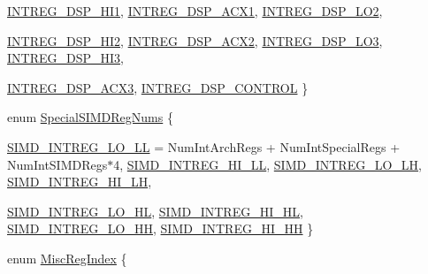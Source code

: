 \begin{DoxyCompactItemize}
\hyperlink{namespaceMipsISA_a9969c99e14b7b491ae9e3751404cc6a1a6bab93bce1ed54db562fec1e6351ea96}{INTREG\_\-DSP\_\-HI1}, 
\hyperlink{namespaceMipsISA_a9969c99e14b7b491ae9e3751404cc6a1ab9bb424cac3a98ce515249220959d2da}{INTREG\_\-DSP\_\-ACX1}, 
\hyperlink{namespaceMipsISA_a9969c99e14b7b491ae9e3751404cc6a1ae6a77a5985df474645968e72d6750d7a}{INTREG\_\-DSP\_\-LO2}, 
\par
\hyperlink{namespaceMipsISA_a9969c99e14b7b491ae9e3751404cc6a1a1ac558fc178c5b5f2fdf6cb1967ca22a}{INTREG\_\-DSP\_\-HI2}, 
\hyperlink{namespaceMipsISA_a9969c99e14b7b491ae9e3751404cc6a1a551bc11390e740e4bc59ddfb8db9cc20}{INTREG\_\-DSP\_\-ACX2}, 
\hyperlink{namespaceMipsISA_a9969c99e14b7b491ae9e3751404cc6a1af9876f9350daf1e1d95574d9fbde7362}{INTREG\_\-DSP\_\-LO3}, 
\hyperlink{namespaceMipsISA_a9969c99e14b7b491ae9e3751404cc6a1a985097d69553dc760c911447989f8e60}{INTREG\_\-DSP\_\-HI3}, 
\par
\hyperlink{namespaceMipsISA_a9969c99e14b7b491ae9e3751404cc6a1a7b37f81d5304a3d791c17361d9f3a454}{INTREG\_\-DSP\_\-ACX3}, 
\hyperlink{namespaceMipsISA_a9969c99e14b7b491ae9e3751404cc6a1a6e80b2e1811d722f397003fc3aa77298}{INTREG\_\-DSP\_\-CONTROL}
 \}
\item 
enum \hyperlink{namespaceMipsISA_a05e4fcfbdafc2aca59e48af73c7f12ec}{SpecialSIMDRegNums} \{ \par
\hyperlink{namespaceMipsISA_a05e4fcfbdafc2aca59e48af73c7f12ecaf0bcaabf7ff02dc3aaecd4bbf5462813}{SIMD\_\-INTREG\_\-LO\_\-LL} =  NumIntArchRegs + NumIntSpecialRegs + NumIntSIMDRegs$\ast$4, 
\hyperlink{namespaceMipsISA_a05e4fcfbdafc2aca59e48af73c7f12ecac23523b35484e7acda24945e39321a9d}{SIMD\_\-INTREG\_\-HI\_\-LL}, 
\hyperlink{namespaceMipsISA_a05e4fcfbdafc2aca59e48af73c7f12eca23f8f913021c11fa71ba055577cf9a6f}{SIMD\_\-INTREG\_\-LO\_\-LH}, 
\hyperlink{namespaceMipsISA_a05e4fcfbdafc2aca59e48af73c7f12ecaa4f542f3a336be0189b3c160a64422ca}{SIMD\_\-INTREG\_\-HI\_\-LH}, 
\par
\hyperlink{namespaceMipsISA_a05e4fcfbdafc2aca59e48af73c7f12eca646de05bcf6a124da8ef80cf70e19176}{SIMD\_\-INTREG\_\-LO\_\-HL}, 
\hyperlink{namespaceMipsISA_a05e4fcfbdafc2aca59e48af73c7f12eca0b06ae619c82ecbcdd19075de12a5a5d}{SIMD\_\-INTREG\_\-HI\_\-HL}, 
\hyperlink{namespaceMipsISA_a05e4fcfbdafc2aca59e48af73c7f12eca9536486f8f579789069507950c88b7c3}{SIMD\_\-INTREG\_\-LO\_\-HH}, 
\hyperlink{namespaceMipsISA_a05e4fcfbdafc2aca59e48af73c7f12eca9cb0f33583f9adc323b378926c06e2de}{SIMD\_\-INTREG\_\-HI\_\-HH}
 \}
\item 
enum \hyperlink{namespaceMipsISA_a1e522017e015d4c7efd6b2360143aa67}{MiscRegIndex} \{ \par

\end{DoxyCompactItemize}
